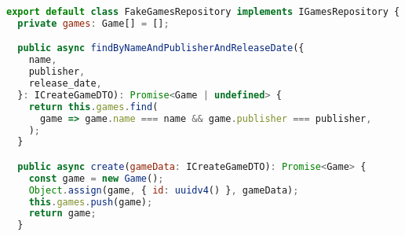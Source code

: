 \begin{lstlisting}[language=JavaScript, caption={FakeGamesRepository.ts},captionpos=b, label=alg:fakegamesrepository]
export default class FakeGamesRepository implements IGamesRepository {
  private games: Game[] = [];

  public async findByNameAndPublisherAndReleaseDate({
    name,
    publisher,
    release_date,
  }: ICreateGameDTO): Promise<Game | undefined> {
    return this.games.find(
      game => game.name === name && game.publisher === publisher,
    );
  }

  public async create(gameData: ICreateGameDTO): Promise<Game> {
    const game = new Game();
    Object.assign(game, { id: uuidv4() }, gameData);
    this.games.push(game);
    return game;
  }
\end{lstlisting}